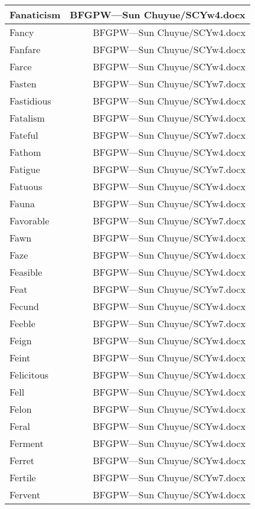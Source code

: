 \documentclass{article}
\begin{document}
\begin{center}
\begin{longtable}{|l|r|}
\hline
Fanaticism  &  BFGPW---Sun Chuyue/SCYw4.docx\\  
\hline
Fancy  &  BFGPW---Sun Chuyue/SCYw4.docx\\  
\hline
Fanfare  &  BFGPW---Sun Chuyue/SCYw4.docx\\  
\hline
Farce  &  BFGPW---Sun Chuyue/SCYw4.docx\\  
\hline
Fasten  &  BFGPW---Sun Chuyue/SCYw7.docx\\  
\hline
Fastidious  &  BFGPW---Sun Chuyue/SCYw4.docx\\  
\hline
Fatalism  &  BFGPW---Sun Chuyue/SCYw4.docx\\  
\hline
Fateful  &  BFGPW---Sun Chuyue/SCYw7.docx\\  
\hline
Fathom  &  BFGPW---Sun Chuyue/SCYw4.docx\\  
\hline
Fatigue  &  BFGPW---Sun Chuyue/SCYw7.docx\\  
\hline
Fatuous  &  BFGPW---Sun Chuyue/SCYw4.docx\\  
\hline
Fauna  &  BFGPW---Sun Chuyue/SCYw4.docx\\  
\hline
Favorable  &  BFGPW---Sun Chuyue/SCYw7.docx\\  
\hline
Fawn  &  BFGPW---Sun Chuyue/SCYw4.docx\\  
\hline
Faze  &  BFGPW---Sun Chuyue/SCYw4.docx\\  
\hline
Feasible  &  BFGPW---Sun Chuyue/SCYw4.docx\\  
\hline
Feat  &  BFGPW---Sun Chuyue/SCYw7.docx\\  
\hline
Fecund  &  BFGPW---Sun Chuyue/SCYw4.docx\\  
\hline
Feeble  &  BFGPW---Sun Chuyue/SCYw7.docx\\  
\hline
Feign  &  BFGPW---Sun Chuyue/SCYw4.docx\\  
\hline
Feint  &  BFGPW---Sun Chuyue/SCYw4.docx\\  
\hline
Felicitous  &  BFGPW---Sun Chuyue/SCYw4.docx\\  
\hline
Fell  &  BFGPW---Sun Chuyue/SCYw4.docx\\  
\hline
Felon  &  BFGPW---Sun Chuyue/SCYw4.docx\\  
\hline
Feral  &  BFGPW---Sun Chuyue/SCYw4.docx\\  
\hline
Ferment  &  BFGPW---Sun Chuyue/SCYw4.docx\\  
\hline
Ferret  &  BFGPW---Sun Chuyue/SCYw4.docx\\  
\hline
Fertile  &  BFGPW---Sun Chuyue/SCYw7.docx\\  
\hline
Fervent  &  BFGPW---Sun Chuyue/SCYw4.docx\\  

\end{longtable}
\end{center}
\end{document}
